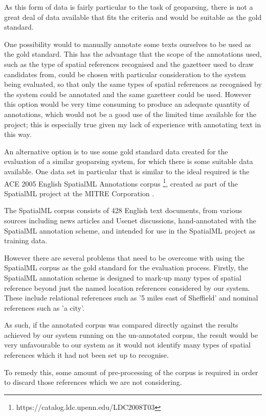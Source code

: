 \documentclass[12pt, a4paper]{report}
\begin{document}
As this form of data is fairly particular to the task of geoparsing, there is not a great deal of data available that fits the criteria and would be suitable as the gold standard.

One possibility would to manually annotate some texts ourselves to be used as the gold standard. This has the advantage that the scope of the annotations used, such as the type of spatial references recognised and the gazetteer used to draw candidates from, could be chosen with particular consideration to the system being evaluated, so that only the same types of spatial references as recognised by the system could be annotated and the same gazetteer could be used. However this option would be very time consuming to produce an adequate quantity of annotations, which would not be a good use of the limited time available for the project; this is especially true given my lack of experience with annotating text in this way. 

An alternative option is to use some gold standard data created for the evaluation of a similar geoparsing system, for which there is some suitable data available. One data set in particular that is similar to the ideal required is the ACE 2005 English SpatialML Annotations corpus \footnote{https://catalog.ldc.upenn.edu/LDC2008T03}, created as part of the SpatialML project at the MITRE Corporation \citep{mani2010}.

The SpatialML corpus consists of 428 English text documents, from various sources including news articles and Usenet discussions, hand-annotated with the SpatialML annotation scheme, and intended for use in the SpatialML project as training data.

However there are several problems that need to be overcome with using the SpatialML corpus as the gold standard for the evaluation process. Firstly, the SpatialML annotation scheme is designed to mark-up many types of spatial reference beyond just the named location references considered by our system. These include relational references such as '5 miles east of Sheffield' and nominal references such as 'a city'.

As such, if the annotated corpus was compared directly against the results achieved by our system running on the un-annotated corpus, the result would be very unfavourable to our system as it would not identify many types of spatial references which it had not been set up to recognise.

To remedy this, some amount of pre-processing of the corpus is required in order to discard those references which we are not considering.
\end{document}
